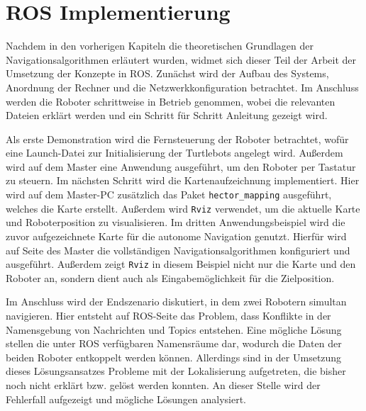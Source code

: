 \chapter{ROS Implementierung}
Nachdem in den vorherigen Kapiteln die theoretischen Grundlagen der Navigationsalgorithmen erläutert wurden, widmet sich dieser Teil der Arbeit der Umsetzung der Konzepte in ROS. Zunächst wird der Aufbau des Systems, Anordnung der Rechner und die Netzwerkkonfiguration betrachtet. Im Anschluss werden die Roboter schrittweise in Betrieb genommen, wobei die relevanten Dateien erklärt werden und  ein Schritt für Schritt Anleitung gezeigt wird.

Als erste Demonstration wird die Fernsteuerung der Roboter betrachtet, wofür eine Launch-Datei zur Initialisierung der Turtlebots angelegt wird. Außerdem wird auf dem Master eine Anwendung ausgeführt, um den Roboter per Tastatur zu steuern.
Im nächsten Schritt wird die Kartenaufzeichnung implementiert. Hier wird auf dem Master-PC zusätzlich das Paket \lstinline{hector_mapping}{} ausgeführt, welches die Karte erstellt. Außerdem wird \lstinline{Rviz}{} verwendet, um die aktuelle Karte und Roboterposition zu visualisieren.
Im dritten Anwendungsbeispiel wird die zuvor aufgezeichnete Karte für die autonome Navigation genutzt. Hierfür wird auf Seite des Master die vollständigen Navigationsalgorithmen konfiguriert und ausgeführt. Außerdem zeigt \lstinline{Rviz}{} in diesem Beispiel nicht nur die Karte und den Roboter an, sondern dient auch als Eingabemöglichkeit für die Zielposition.

Im Anschluss wird der Endszenario diskutiert, in dem zwei Robotern simultan navigieren. Hier entsteht auf ROS-Seite das Problem, dass Konflikte in der Namensgebung von Nachrichten und Topics entstehen. Eine mögliche Lösung stellen die unter ROS verfügbaren Namensräume dar, wodurch die Daten der beiden Roboter entkoppelt werden können. Allerdings sind in der Umsetzung dieses Lösungsansatzes Probleme mit der Lokalisierung aufgetreten, die bisher noch nicht erklärt bzw. gelöst werden konnten. An dieser Stelle wird der Fehlerfall aufgezeigt und mögliche Lösungen analysiert.

\newpage


\newpage
